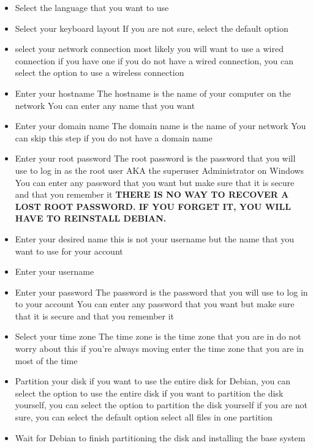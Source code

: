 \begin{itemize}
    \item Select the language that you want to use
    \item Select your keyboard layout 
    \subitem If you are not sure, select the default option
    \item select your network connection 
    \subitem most likely you will want to use a wired connection if you have one
    \subitem if you do not have a wired connection, you can select the option to use a wireless connection
    \item Enter your hostname
    \subitem The hostname is the name of your computer on the network
    \subitem You can enter any name that you want
    \item Enter your domain name
    \subitem The domain name is the name of your network 
    \subitem You can skip this step if you do not have a domain name
    \item Enter your root password
    \subitem The root password is the password that you will use to log in as the root user AKA the superuser Administrator on Windows
    \subitem You can enter any password that you want but make sure that it is secure and that you remember it 
    \subitem \textbf{THERE IS NO WAY TO RECOVER A LOST ROOT PASSWORD. IF YOU FORGET IT, YOU WILL HAVE TO REINSTALL DEBIAN.}
    \item Enter your desired name this is not your username but the name that you want to use for your account 
    \item Enter your username
    \item Enter your password
    \subitem The password is the password that you will use to log in to your account
    \subitem You can enter any password that you want but make sure that it is secure and that you remember it
    \item Select your time zone
    \subitem The time zone is the time zone that you are in do not worry about this if you're always moving enter the time zone that you are in most of the time 
    \item Partition your disk
    \subitem if you want to use the entire disk for Debian, you can select the option to use the entire disk
    \subitem if you want to partition the disk yourself, you can select the option to partition the disk yourself
    \subitem if you are not sure, you can select the default option
    \subitem select all files in one partition
    \item Wait for Debian to finish partitioning the disk and installing the base system

\end{itemize}

